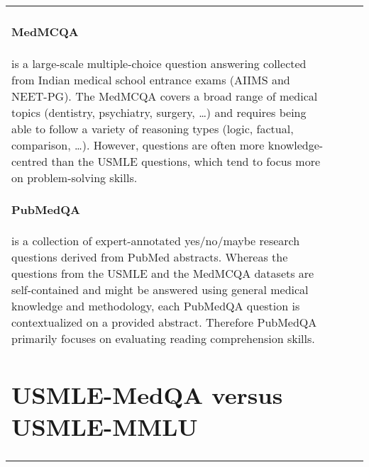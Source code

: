 \documentclass{article} \usepackage{iclr2022_conference,times}
\begin{document}
\begin{table}[h]
\begin{center}
{\begin{tabular}{lccc}
{ \paragraph{MedMCQA} 
 \cite{Pal2022-ph} is a large-scale multiple-choice question answering collected from Indian medical school entrance exams (AIIMS and NEET-PG). The MedMCQA covers a broad range of medical topics (dentistry, psychiatry, surgery, \ldots) and requires being able to follow a variety of reasoning types (logic, factual, comparison, \ldots). However, questions are often more knowledge-centred than the USMLE questions, which tend to focus more on problem-solving skills.
 
 \paragraph{PubMedQA} 
\cite{Jin2019-qa} is a collection of expert-annotated yes/no/maybe research questions derived from PubMed abstracts. Whereas the questions from the USMLE and the MedMCQA datasets are self-contained and might be answered using general medical knowledge and methodology, each PubMedQA question is contextualized on a provided abstract. Therefore PubMedQA primarily focuses on evaluating reading comprehension skills. 


\section{USMLE-MedQA versus USMLE-MMLU}\label{apdx:medqa-vs-mmlu}

}
\end{tabular}}
\end{center}
\end{table}
\end{document}
